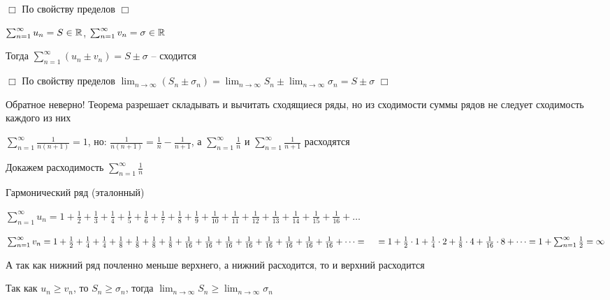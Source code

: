 \documentclass[12pt]{article}
\begin{document}
    \begin{tcolorbox}
        $\Box$ По свойству пределов $\Box$
    \end{tcolorbox}

    \begin{MyTheorem}
         $\sum_{n = 1}^\infty u_n = S \in \mathbb{R}$, $\sum_{n = 1}^\infty v_n = \sigma \in \mathbb{R}$

        Тогда $\sum_{n = 1}^\infty (u_n \pm v_n) = S \pm \sigma$ -- сходится
    \end{MyTheorem}

    \begin{tcolorbox}
        $\Box$ По свойству пределов $\lim_{n \to\infty} (S_n \pm \sigma_n) = \lim_{n \to\infty} S_n \pm \lim_{n \to\infty} \sigma_n = S \pm \sigma$ $\Box$
    \end{tcolorbox}

    \Nota Обратное неверно! Теорема разрешает складывать и вычитать сходящиеся ряды, но из сходимости суммы рядов не следует сходимость каждого из них

    \Exs $\sum_{n = 1}^\infty \frac{1}{n (n + 1)} = 1$, \quad но: $\frac{1}{n (n + 1)} = \frac{1}{n} - \frac{1}{n + 1}$,
    а $\sum_{n = 1}^\infty \frac{1}{n}$ и $\sum_{n = 1}^\infty \frac{1}{n + 1}$ расходятся

    \Nota Докажем расходимость $\sum_{n = 1}^\infty \frac{1}{n}$

    \hypertarget{harmonicseries}{}

    \Exs Гармонический ряд (эталонный)

    $\sum_{n = 1}^\infty u_n = 1 + \frac{1}{2} + \frac{1}{3} + \frac{1}{4} + \frac{1}{5} + \frac{1}{6} + \frac{1}{7} + \frac{1}{8} + \frac{1}{9} + \frac{1}{10} + \frac{1}{11} + \frac{1}{12} + \frac{1}{13} + \frac{1}{14} + \frac{1}{15} + \frac{1}{16} + \dots$

    $\sum_{n = 1}^\infty v_n = 1 + \frac{1}{2} + \frac{1}{4} + \frac{1}{4} + \frac{1}{8} + \frac{1}{8} + \frac{1}{8} + \frac{1}{8} + \frac{1}{16} + \frac{1}{16} + \frac{1}{16} + \frac{1}{16} + \frac{1}{16} + \frac{1}{16} + \frac{1}{16} + \frac{1}{16} + \dots = \\
    \quad = 1 + \frac{1}{2} \cdot 1 + \frac{1}{4} \cdot 2 + \frac{1}{8} \cdot 4 + \frac{1}{16} \cdot 8 + \dots = 1 + \sum_{n = 1}^\infty \frac{1}{2} = \infty$

    А так как нижний ряд почленно меньше верхнего, а нижний расходится, то и верхний расходится

    Так как $u_n \geq v_n$, то $S_n \geq \sigma_n$, тогда $\lim_{n \to\infty} S_n \geq \lim_{n \to\infty} \sigma_n$
\end{document}

